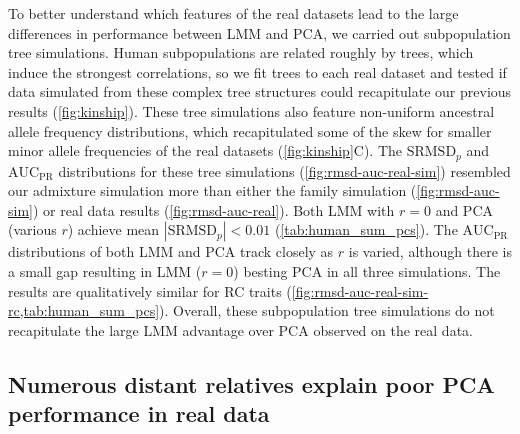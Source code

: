 \documentclass[11pt]{article}
\newcommand{\rmsd}{\text{SRMSD}_p}
\newcommand{\auc}{\text{AUC}_\text{PR}}
\begin{document}
\begin{linenumbers}
To better understand which features of the real datasets lead to the large differences in performance between LMM and PCA, we carried out subpopulation tree simulations.
Human subpopulations are related roughly by trees, which induce the strongest correlations, so we fit trees to each real dataset and tested if data simulated from these complex tree structures could recapitulate our previous results (\cref{fig:kinship}).
These tree simulations also feature non-uniform ancestral allele frequency distributions, which recapitulated some of the skew for smaller minor allele frequencies of the real datasets (\cref{fig:kinship}C).
The $\rmsd$ and $\auc$ distributions for these tree simulations (\cref{fig:rmsd-auc-real-sim}) resembled our admixture simulation more than either the family simulation (\cref{fig:rmsd-auc-sim}) or real data results (\cref{fig:rmsd-auc-real}).
Both LMM with $r=0$ and PCA (various $r$) achieve mean $|\rmsd| < 0.01$ (\cref{tab:human_sum_pcs}).
The $\auc$ distributions of both LMM and PCA track closely as $r$ is varied, although there is a small gap resulting in LMM ($r=0$) besting PCA in all three simulations.
The results are qualitatively similar for RC traits (\cref{fig:rmsd-auc-real-sim-rc,tab:human_sum_pcs}).
Overall, these subpopulation tree simulations do not recapitulate the large LMM advantage over PCA observed on the real data.

\subsection{Numerous distant relatives explain poor PCA performance in real data}


\end{linenumbers}
\end{document}
